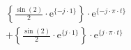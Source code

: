 \correct
\[
\begin{split}
&  \left \{ \frac{\sin(2)}{2} \cdot \textrm{e}^{\{  -j \cdot 1 \}} \right \} \cdot \textrm{e}^{\{ -j \cdot \pi \cdot t \}} \\
&+ \left \{ \frac{\sin(2)}{2} \cdot \textrm{e}^{\{   j \cdot 1 \}} \right \} \cdot \textrm{e}^{\{  j \cdot \pi \cdot t \}}
\end{split}
\]
